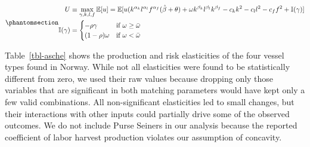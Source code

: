 \documentclass[
  letterpaper,
  DIV=11,
  numbers=noendperiod]{scrartcl}
\theoremstyle{plain}
\theoremstyle{plain}
\theoremstyle{remark}
\begin{document}
\begin{equation}\phantomsection\label{eq-maxasche}{
\begin{aligned}
U&\equiv\max_{\gamma,k,l,f}\mathbb{E}[u]=\mathbb{E}[u(k^{\alpha_k}l^{\alpha_l}f^{\alpha_f}(\hat\beta+\theta)+\omega k^{\beta_k}l^{\beta_l}k^{\beta_f}-c_kk^2-c_ll^2-c_ff^2+\mathbb{I}(\gamma)]\\
\mathbb{I}(\gamma)&=\begin{cases}-\rho\gamma & \text{if } \omega\ge \bar \omega\\
(1-\rho)\omega& \text{if } \omega<\bar \omega
\end{cases}
\end{aligned}
}\end{equation}

Table~\ref{tbl-asche} shows the production and risk elasticities of the
four vessel types found in Norway. While not all elasticities were found
to be statistically different from zero, we used their raw values
because dropping only those variables that are significant in both
matching parameters would have kept only a few valid combinations. All
non-significant elasticities led to small changes, but their
interactions with other inputs could partially drive some of the
observed outcomes. We do not include Purse Seiners in our analysis
because the reported coefficient of labor harvest production violates
our assumption of concavity.
\end{document}
